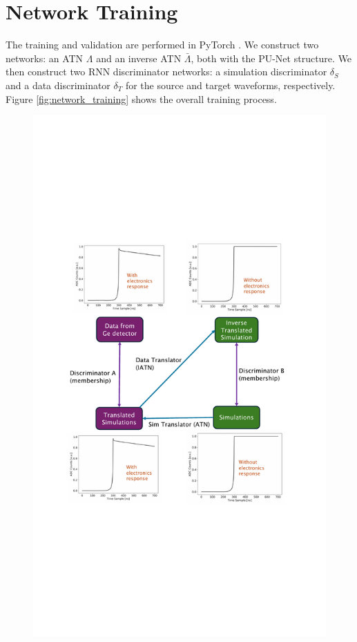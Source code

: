 \section{Network Training}
The training and validation are performed in PyTorch \cite{pytorch}. We construct two networks: an ATN $\Lambda$ and an inverse ATN $\bar{\Lambda}$, both with the PU-Net structure. We then construct two RNN discriminator networks: a simulation discriminator $\delta_{S}$ and a data discriminator $\delta_{T}$ for the source and target waveforms, respectively. Figure \ref{fig:network_training} shows the overall training process.
\clearpage
\begin{figure}[htb!]
    \centering
    \includegraphics[width=0.99\linewidth,trim={5.5pc 20pc 6.3pc 19pc},clip]{ch7/figs/cycle_gan_training.pdf}

\end{figure}

